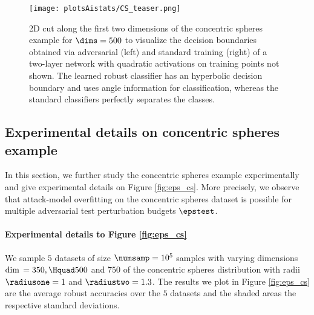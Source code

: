 
\begin{figure}[!ht]
\centering
  \texttt{[image: plotsAistats/CS\_teaser.png]}
  \caption{2D cut along the first two dimensions of the concentric spheres
    example for $\dims=500$ to visualize the decision boundaries obtained via adversarial (left) and standard training (right) of a two-layer network with quadratic activations on training points not shown. The learned robust classifier has an hyperbolic decision boundary and uses angle information for classification, whereas the standard classifiers perfectly separates the classes.
  }
\label{fig:teaser_concentric_spheres}
\end{figure}


\subsection{Experimental details on concentric spheres example}
\label{sec:app_expcs}

In this section, we further study the concentric spheres example experimentally and give experimental details on Figure \ref{fig:eps_cs}. More precisely, we observe that attack-model overfitting on the concentric spheres dataset is possible for multiple adversarial test perturbation budgets $\epstest$.

\paragraph{Experimental details to Figure   \ref{fig:eps_cs}}
We sample $5$ datasets of size $\numsamp =10^5$ samples with varying dimensions $\dim{} = 350, \Hquad 500$ and $750$ of the concentric spheres distribution with radii $\radiusone = 1$ and $\radiustwo = 1.3$. The results we plot in Figure \ref{fig:eps_cs} are the average robust accuracies over the $5$ datasets and the shaded areas the respective standard deviations.

